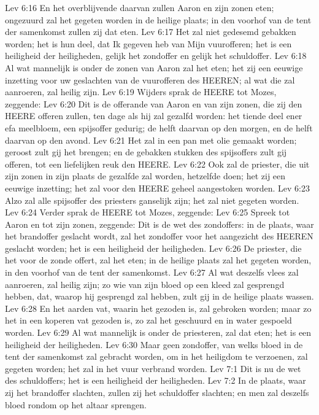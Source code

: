 Lev 6:16  En het overblijvende daarvan zullen Aaron en zijn zonen eten; ongezuurd zal het gegeten worden in de heilige plaats; in den voorhof van de tent der samenkomst zullen zij dat eten.
Lev 6:17  Het zal niet gedesemd gebakken worden; het is hun deel, dat Ik gegeven heb van Mijn vuurofferen; het is een heiligheid der heiligheden, gelijk het zondoffer en gelijk het schuldoffer.
Lev 6:18  Al wat mannelijk is onder de zonen van Aaron zal het eten; het zij een eeuwige inzetting voor uw geslachten van de vuurofferen des HEEREN; al wat die zal aanroeren, zal heilig zijn.
Lev 6:19  Wijders sprak de HEERE tot Mozes, zeggende:
Lev 6:20  Dit is de offerande van Aaron en van zijn zonen, die zij den HEERE offeren zullen, ten dage als hij zal gezalfd worden: het tiende deel ener efa meelbloem, een spijsoffer gedurig; de helft daarvan op den morgen, en de helft daarvan op den avond.
Lev 6:21  Het zal in een pan met olie gemaakt worden; geroost zult gij het brengen; en de gebakken stukken des spijsoffers zult gij offeren, tot een liefelijken reuk den HEERE.
Lev 6:22  Ook zal de priester, die uit zijn zonen in zijn plaats de gezalfde zal worden, hetzelfde doen; het zij een eeuwige inzetting; het zal voor den HEERE geheel aangestoken worden.
Lev 6:23  Alzo zal alle spijsoffer des priesters ganselijk zijn; het zal niet gegeten worden.
Lev 6:24  Verder sprak de HEERE tot Mozes, zeggende:
Lev 6:25  Spreek tot Aaron en tot zijn zonen, zeggende: Dit is de wet des zondoffers: in de plaats, waar het brandoffer geslacht wordt, zal het zondoffer voor het aangezicht des HEEREN geslacht worden; het is een heiligheid der heiligheden.
Lev 6:26  De priester, die het voor de zonde offert, zal het eten; in de heilige plaats zal het gegeten worden, in den voorhof van de tent der samenkomst.
Lev 6:27  Al wat deszelfs vlees zal aanroeren, zal heilig zijn; zo wie van zijn bloed op een kleed zal gesprengd hebben, dat, waarop hij gesprengd zal hebben, zult gij in de heilige plaats wassen.
Lev 6:28  En het aarden vat, waarin het gezoden is, zal gebroken worden; maar zo het in een koperen vat gezoden is, zo zal het geschuurd en in water gespoeld worden.
Lev 6:29  Al wat mannelijk is onder de priesteren, zal dat eten; het is een heiligheid der heiligheden.
Lev 6:30  Maar geen zondoffer, van welks bloed in de tent der samenkomst zal gebracht worden, om in het heiligdom te verzoenen, zal gegeten worden; het zal in het vuur verbrand worden.
Lev 7:1  Dit is nu de wet des schuldoffers; het is een heiligheid der heiligheden.
Lev 7:2  In de plaats, waar zij het brandoffer slachten, zullen zij het schuldoffer slachten; en men zal deszelfs bloed rondom op het altaar sprengen.
